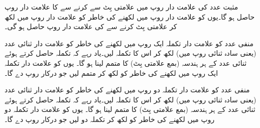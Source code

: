 	مثبت عدد    کی  علامت دار روپ  میں  علامتی  بِٹ       سے     کرنے سے     کا علامت دار  روپ    حاصل ہو گا۔یوں  کو  علامت دار روپ   میں لکھنے کی خاطر   کو علامت دار روپ    میں لکھ کر علامتی بِٹ   کرنے سے  کی علامت دار روپ    حاصل ہو گی۔
	
منفی عدد   کو  علامت دار  تکملہ ایک روپ میں لکھنے کی خاطر   کو علامت دار  ثنائی عدد (یعنی سادہ ثنائی  روپ میں)   لکھ کر اس کا  تکملہ  لیں۔یاد رہے کہ تکملہ  حاصل کرتے ہوئے  ثنائی عدد کے ہر ہندسہ  (بمع  علامتی بِٹ) کا متمم لینا ہو گا۔ یوں  کو علامت دار تکملہ ایک روپ  میں لکھنے کی خاطر    کو     لکھ  کر متمم لیں   جو درکار روپ     دے گا۔

منفی عدد   کو  علامت دار  تکملہ دو  روپ میں لکھنے کی خاطر   کو علامت دار  ثنائی عدد (یعنی سادہ ثنائی  روپ میں)   لکھ کر اس کا  تکملہ  لیں۔یاد رہے کہ تکملہ  حاصل کرتے ہوئے  ثنائی عدد کے ہر ہندسہ  (بمع  علامتی بِٹ) کا متمم لینا ہو گا۔ یوں  کو علامت دار تکملہ دو  روپ  میں لکھنے کی خاطر    کو     لکھ  کر  تکملہ دو لیں   جو درکار روپ      دے گا۔
